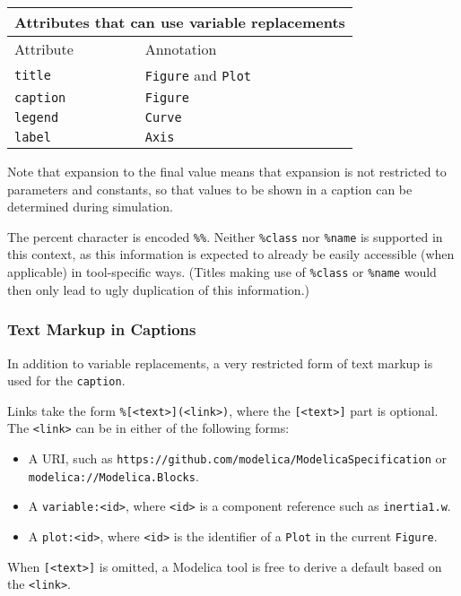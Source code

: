 \begin{longtable}[]{|l|l|}
\hline
\multicolumn{2}{|l|}{Attributes that can use variable replacements}\\ \hline
Attribute & Annotation \\ \hline
\lstinline!title! & \lstinline!Figure! and \lstinline!Plot! \\ \hline
\lstinline!caption! & \lstinline!Figure! \\ \hline
\lstinline!legend! & \lstinline!Curve! \\ \hline
\lstinline!label! & \lstinline!Axis! \\ \hline
\end{longtable}

Note that expansion to the final value means that expansion is not restricted to
parameters and constants, so that values to be shown in a caption can be
determined during simulation.

The percent character is encoded \lstinline!%%!.  Neither \lstinline!%class! nor
\lstinline!%name! is supported in this context, as this information is expected
to already be easily accessible (when applicable) in tool-specific ways. (Titles
making use of \lstinline!%class! or \lstinline!%name! would then only lead to
ugly duplication of this information.)

\subsubsection{Text Markup in Captions}\label{text-markup-in-captions}
In addition to variable replacements, a very restricted form of text markup is
used for the \lstinline!caption!.

Links take the form \lstinline!%[<text>](<link>)!, where the
\lstinline![<text>]! part is optional. The \lstinline!<link>! can be in either
of the following forms:
\begin{itemize}
\item A URI, such as
\lstinline!https://github.com/modelica/ModelicaSpecification! or
\lstinline!modelica://Modelica.Blocks!.
\item A \lstinline!variable:<id>!, where \lstinline!<id>! is a component
reference such as \lstinline!inertia1.w!.
\item A \lstinline!plot:<id>!, where \lstinline!<id>! is the identifier of a
\lstinline!Plot! in the current \lstinline!Figure!.
\end{itemize}

When \lstinline![<text>]! is omitted, a Modelica tool is free to derive a default based on
the \lstinline!<link>!.


